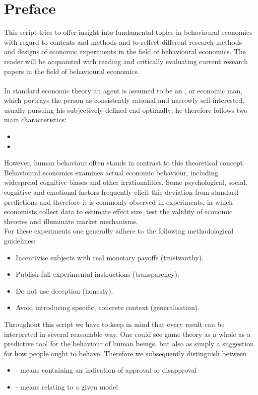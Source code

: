 

\chapter*{Preface}

This script tries to offer insight into fundamental topics in behavioural economics with regard to contents and methods and to reflect different research methods and designs of economic experiments in the field of behavioural economics. The reader will be acquainted with reading and critically evaluating current research papers in the field of behavioural economics. \\ \\

In standard economic theory an agent is assumed to be an , or economic man, which portrays the person as consistently rational and narrowly self-interested, usually pursuing his subjectively-defined end optimally; he therefore follows two main characteristics:
\begin{itemize}
	\item {}
	\item {}
\end{itemize}
However, human behaviour often stands in contrast to this theoretical concept. Behavioural economics examines actual economic behaviour, including widespread cognitive biases and other irrationalities. Some psychological, social, cognitive and emotional factors frequently elicit this deviation from standard predictions and therefore it is commonly observed in experiments, in which economists collect data to estimate effect size, test the validity of economic theories and illuminate market mechanisms. \\
For these experiments one generally adhere to the following methodological guidelines:
	\begin{itemize}
		\item Incentivise subjects with real monetary payoffs (trustworthy).
		\item Publish full experimental instructions (transparency).
		\item Do not use deception (honesty).
		\item Avoid introducing specific, concrete context (generalisation).
	\end{itemize}
	
Throughout this script we have to keep in mind that every result can be interpreted in several reasonable way. One could see game theory as a whole as a predictive tool for the behaviour of human beings, but also as simply a suggestion for how people ought to behave. Therefore we subsequently distinguish between
\begin{itemize}
	\item {} - means containing an indication of approval or disapproval
	\item {} - means relating to a given model
\end{itemize}


